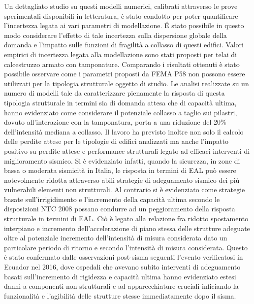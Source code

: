 Un dettagliato studio su questi modelli numerici, calibrati attraverso le prove sperimentali disponibili in letteratura, è stato condotto per poter quantificare l’incertezza legata ai vari parametri di modellazione. É stato possibile in questo modo considerare l’effetto di tale incertezza sulla dispersione globale della domanda e l’impatto sulle funzioni di fragilità a collasso di questi edifici. Valori empirici di incertezza legata alla modellazione sono stati proposti per telai di calcestruzzo armato con tamponature. Comparando i risultati ottenuti è stato possibile osservare come i parametri proposti da FEMA P58 non possono essere utilizzati per la tipologia strutturale oggetto di studio. Le analisi realizzate su un numero di modelli tale da caratterizzare pienamente la risposta di questa tipologia strutturale in termini sia di domanda attesa che di capacità ultima, hanno evidenziato come considerare il potenziale collasso a taglio sui pilastri, dovuto all’interazione con la tamponatura, porta a una riduzione del 20\% dell’intensità mediana a collasso. Il lavoro ha previsto inoltre non solo il calcolo delle perdite attese per le tipologie di edifici analizzati ma anche l’impatto positivo su perdite attese e performance strutturali legato ad efficaci interventi di miglioramento sismico. Si è evidenziato infatti, quando la sicurezza, in zone di bassa o moderata sismicità in Italia, le risposta in termini di EAL può essere notevolmente ridotta attraverso abili strategie di adeguamento sismico dei più vulnerabili elementi non strutturali. Al contrario si è evidenziato come strategie basate sull’irrigidimento e l’incremento della capacità ultima secondo le disposizioni NTC 2008 possano condurre ad un peggioramento della risposta strutturale in termini di EAL. Ciò è legato alla relazione fra ridotto spostamento interpiano e incremento dell’accelerazione di piano stessa delle strutture adeguate oltre al potenziale incremento dell’intensità di misura considerata dato un particolare periodo di ritorno e secondo l’intensità di misura considerata. Questo è stato confermato dalle osservazioni post-sisma seguenti l’evento verificatosi in Ecuador nel 2016, dove ospedali che avevano subito interventi di adeguamento basati sull’incremento di rigidezza e capacità ultima hanno evidenziato estesi danni a componenti non strutturali e ad apparecchiature cruciali inficiando la funzionalità e l’agibilità delle strutture stesse immediatamente dopo il sisma.

